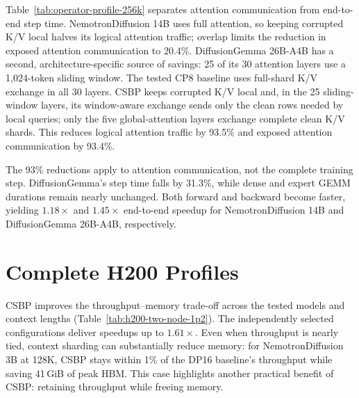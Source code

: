 Table~\ref{tab:operator-profile-256k} separates attention communication from
end-to-end step time. NemotronDiffusion 14B uses full attention, so keeping
corrupted K/V local halves its logical attention traffic; overlap limits the
reduction in exposed attention communication to 20.4\%. DiffusionGemma 26B-A4B
has a second, architecture-specific source of savings: 25 of its 30 attention
layers use a 1,024-token sliding window. The tested CP8 baseline uses full-shard
K/V exchange in all 30 layers. CSBP keeps corrupted K/V local and, in the 25
sliding-window layers, its window-aware exchange sends only the clean rows
needed by local queries; only the five global-attention layers exchange
complete clean K/V shards. This reduces logical attention traffic by 93.5\%
and exposed attention communication by 93.4\%.



The 93\% reductions apply to attention communication, not the complete
training step. DiffusionGemma's step time falls by 31.3\%, while dense and
expert GEMM durations remain nearly unchanged. Both forward and backward
become faster, yielding $1.18\times$ and $1.45\times$ end-to-end speedup for
NemotronDiffusion 14B and DiffusionGemma 26B-A4B, respectively.

\section{Complete H200 Profiles}
\label{app:h200-profiles}

CSBP improves the throughput--memory trade-off across the tested models and
context lengths (Table~\ref{tab:h200-two-node-1p2}). The independently selected
configurations deliver speedups up to $1.61\times$. Even when throughput is
nearly tied, context sharding can substantially reduce memory: for NemotronDiffusion
3B at 128K, CSBP stays within 1\% of the DP16 baseline's throughput while
saving 41\,GiB of peak HBM. This case highlights another practical benefit
of CSBP: retaining throughput while freeing memory.


